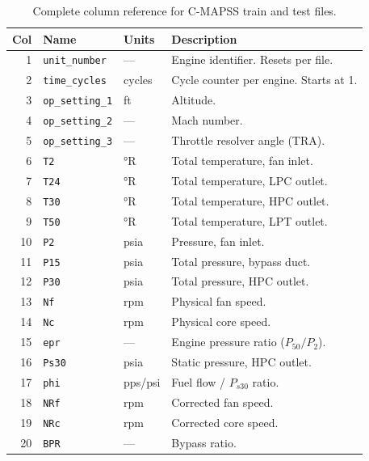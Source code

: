 \documentclass[11pt, a4paper]{article}
\begin{document}
\begin{table}[H]
  \centering
  \caption{Complete column reference for C-MAPSS train and test files.}
  \label{tab:columns}
  \small
  \begin{tabular}{@{}rllp{5.5cm}@{}}
    \toprule
    Col & Name & Units & Description \\
    \midrule
    1  & \texttt{unit\_number}  & ---     & Engine identifier. Resets per file. \\
    2  & \texttt{time\_cycles}  & cycles  & Cycle counter per engine. Starts at 1. \\
    \midrule
    3  & \texttt{op\_setting\_1} & ft     & Altitude. \\
    4  & \texttt{op\_setting\_2} & ---    & Mach number. \\
    5  & \texttt{op\_setting\_3} & ---    & Throttle resolver angle (TRA). \\
    \midrule
    6  & \texttt{T2}            & °R      & Total temperature, fan inlet. \\
    7  & \texttt{T24}           & °R      & Total temperature, LPC outlet. \\
    8  & \texttt{T30}           & °R      & Total temperature, HPC outlet. \\
    9  & \texttt{T50}           & °R      & Total temperature, LPT outlet. \\
    10 & \texttt{P2}            & psia    & Pressure, fan inlet. \\
    11 & \texttt{P15}           & psia    & Total pressure, bypass duct. \\
    12 & \texttt{P30}           & psia    & Total pressure, HPC outlet. \\
    13 & \texttt{Nf}            & rpm     & Physical fan speed. \\
    14 & \texttt{Nc}            & rpm     & Physical core speed. \\
    15 & \texttt{epr}           & ---     & Engine pressure ratio ($P_{50}/P_2$). \\
    16 & \texttt{Ps30}          & psia    & Static pressure, HPC outlet. \\
    17 & \texttt{phi}           & pps/psi & Fuel flow / $P_{s30}$ ratio. \\
    18 & \texttt{NRf}           & rpm     & Corrected fan speed. \\
    19 & \texttt{NRc}           & rpm     & Corrected core speed. \\
    20 & \texttt{BPR}           & ---     & Bypass ratio. \\

\end{tabular}
\end{table}
\end{document}
